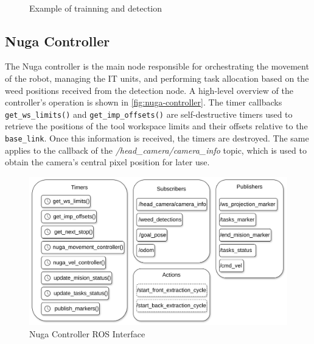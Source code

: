 \begin{figure}[htb]
    \myfloatalign
     \quad
     \\
    \caption{Example of trainning and detection}\label{fig:rumex-example}
\end{figure}

\subsection{Nuga Controller}
The Nuga controller is the main node responsible for orchestrating the movement of the robot, managing the \ac{IT} units, and performing task allocation based on the weed positions received from the detection node. A high-level overview of the controller's operation is shown in \autoref{fig:nuga-controller}. The timer callbacks \texttt{get\_ws\_limits()} and \texttt{get\_imp\_offsets()} are self-destructive timers used to retrieve the positions of the tool workspace limits and their offsets relative to the \texttt{base\_link}. Once this information is received, the timers are destroyed. The same applies to the callback of the \textit{/head\_camera/camera\_info} topic, which is used to obtain the camera’s central pixel position for later use.

\begin{figure}[ht]
    \centering
    \includegraphics[width=0.95\linewidth]{gfx/ch03/nuga_controller.png}
    \caption{Nuga Controller ROS Interface}
    \label{fig:nuga-controller}
\end{figure}

